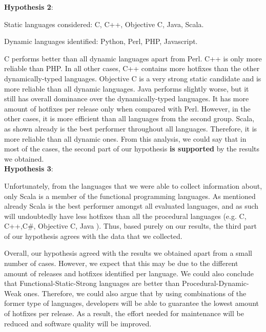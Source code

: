 \textbf{Hypothesis 2}:\par
Static languages considered: C, C++, Objective C, Java, Scala.\par
Dynamic languages identified: Python, Perl, PHP, Javascript.\par

C performs better than all dynamic languages apart from Perl. 
C++ is only more reliable than PHP. In all other cases, C++ contains more hotfixes than the other dynamically-typed languages. 
Objective C is a very strong static candidate and is more reliable than all dynamic languages. Java performs slightly worse, but it still has overall dominance over the dynamically-typed languages. It has more amount of hotfixes per release only when compared with Perl. However, in the other cases, it is more efficient than all languages from the second group. Scala, as shown already is the best performer throughout all languages. Therefore, it is more reliable than all dynamic ones. From this analysis, we could say that in most of the cases, the second part of our hypothesis \textbf{is supported} by the results we obtained.\\

\textbf{Hypothesis 3}:\par
Unfortunately, from the languages that we were able to collect information about, only Scala is a member of the functional programming languages. As mentioned already Scala is the best performer amongst all evaluated languages, and as such will undoubtedly have less hotfixes than all the procedural languages (e.g. C, C++,C\#, Objective C, Java ). Thus, based purely on our results, the third part of our hypothesis agrees with the data that we collected.\par

Overall, our hypothesis agreed with the results we obtained apart from a small number of cases. However, we expect that this may be due to the different amount of releases and hotfixes identified per language. We could also conclude that Functional-Static-Strong languages are better than Procedural-Dynamic-Weak ones. Therefore, we could also argue that by using combinations of the former type of languages, developers will be able to guarantee the lowest amount of hotfixes per release. As a result, the effort needed for maintenance will be reduced and software quality will be improved.

